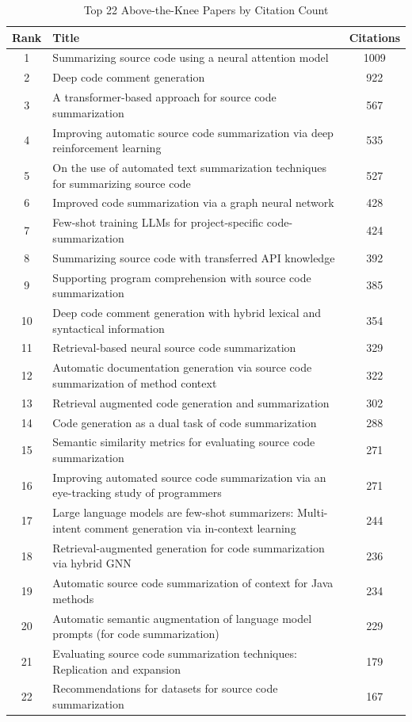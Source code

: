 \begin{table}[ht]
\centering
\caption{Top 22 Above-the-Knee Papers by Citation Count}
\label{tab:above-knee}
\begin{tabular}{clc}
\toprule
Rank & Title & Citations \\
\midrule
1 & Summarizing source code using a neural attention model & 1009 \\
2 & Deep code comment generation & 922 \\
3 & A transformer-based approach for source code summarization & 567 \\
4 & Improving automatic source code summarization via deep reinforcement learning & 535 \\
5 & On the use of automated text summarization techniques for summarizing source code & 527 \\
6 & Improved code summarization via a graph neural network & 428 \\
7 & Few-shot training LLMs for project-specific code-summarization & 424 \\
8 & Summarizing source code with transferred API knowledge & 392 \\
9 & Supporting program comprehension with source code summarization & 385 \\
10 & Deep code comment generation with hybrid lexical and syntactical information & 354 \\
11 & Retrieval-based neural source code summarization & 329 \\
12 & Automatic documentation generation via source code summarization of method context & 322 \\
13 & Retrieval augmented code generation and summarization & 302 \\
14 & Code generation as a dual task of code summarization & 288 \\
15 & Semantic similarity metrics for evaluating source code summarization & 271 \\
16 & Improving automated source code summarization via an eye-tracking study of programmers & 271 \\
17 & Large language models are few-shot summarizers: Multi-intent comment generation via in-context learning & 244 \\
18 & Retrieval-augmented generation for code summarization via hybrid GNN & 236 \\
19 & Automatic source code summarization of context for Java methods & 234 \\
20 & Automatic semantic augmentation of language model prompts (for code summarization) & 229 \\
21 & Evaluating source code summarization techniques: Replication and expansion & 179 \\
22 & Recommendations for datasets for source code summarization & 167 \\
\bottomrule
\end{tabular}
\end{table}



